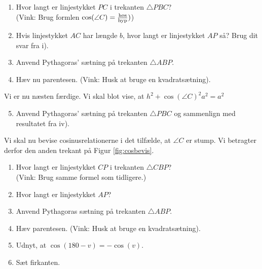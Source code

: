 \begin{enumerate}[label=\roman*)	]
	\item Hvor langt er linjestykket $PC$ i trekanten $\triangle PBC$? \\ (Vink: Brug formlen
	 $\cos(\angle C) = \frac{\textnormal{hos}}{\textnormal{hyp}})$)
	 \item Hvis linjestykket $AC$ har længde $b$, hvor langt er linjestykket $AP$ så? Brug dit svar fra i).
	 \item Anvend Pythagoras' sætning på trekanten $\triangle ABP$.
	 \item Hæv nu parentesen. (Vink: Husk at bruge en kvadratsætning).
\end{enumerate}
Vi er nu næsten færdige. Vi skal blot vise, at $h^2 + \cos(\angle C)^2a^2 = a^2$
\begin{enumerate}[label=\roman*)]
	\setcounter{enumi}{4}
	\item Anvend Pythagoras' sætning på trekanten $\triangle PBC$ og sammenlign med resultatet fra iv).
\end{enumerate}
Vi skal nu bevise cosinusrelationerne i det tilfælde, at $\angle C$ er stump. Vi betragter derfor den anden trekant på Figur \ref{fig:cosbevis}.

\begin{enumerate}[label=\roman*)]
	\item Hvor langt er linjestykket $CP$ i trekanten $\triangle CBP$? \\
	(Vink: Brug samme formel som tidligere.)
	\item Hvor langt er linjestykket $AP$?
	\item Anvend Pythagoras sætning på trekanten $\triangle ABP$.
	\item Hæv parentesen. (Vink: Husk at bruge en kvadratsætning).
	\item Udnyt, at $\cos(180 - v) = -\cos(v)$.
	\item Sæt firkanten.
\end{enumerate}

